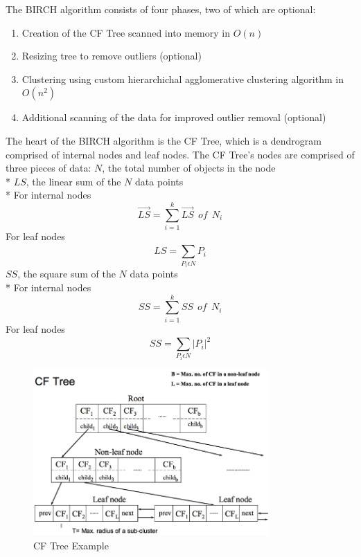\documentclass[conference, 10pt]{IEEEtran}
\begin{document}
The BIRCH algorithm consists of four phases, two of which are optional:
\vspace{1 mm}
\begin{enumerate}
  \item Creation of the CF Tree scanned into memory in $O(n)$
  \item Resizing tree to remove outliers (optional)
  \item Clustering using custom hierarchichal agglomerative clustering algorithm in $O(n^2)$
  \item Additional scanning of the data for improved outlier removal (optional)
\end{enumerate}
\vspace{1 mm}

The heart of the BIRCH algorithm is the CF Tree, which is a dendrogram comprised of internal nodes and leaf nodes. The CF Tree's nodes are comprised of three pieces of data:\vspace{1 mm}
$N$, the total number of objects in the node\\*
$LS$, the linear sum of the $N$ data points\\*
For internal nodes
\begin{equation}
\overrightarrow{LS} = \sum_{i=1}^{k}\overrightarrow{LS}\:\:of\:\:N_i
\end{equation}
For leaf nodes
\begin{equation}
LS = \sum_{P_i\epsilon N}^{ }P_i
\end{equation}
$SS$, the square sum of the $N$ data points\\*
For internal nodes
\begin{equation}
SS = \sum_{i=1}^{k}SS\:\:of\:\:N_i
\end{equation}
For leaf nodes
\begin{equation}
SS = \sum_{P_i\epsilon N}^{ }\left | P_i\right |^2
\end{equation}

\begin{figure}[!hb]
    \centering
    \includegraphics[width=90mm]{cf_tree.png}
    \caption{CF Tree Example}
\end{figure}
\end{document}
